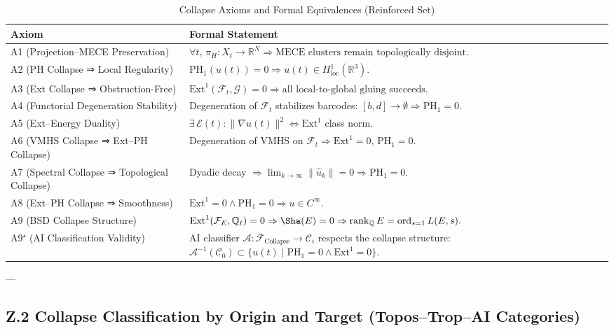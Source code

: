 \documentclass[11pt]{article}
\begin{document}
\begin{axiom}
\begin{axiom}
{{\begin{table}[H]
\centering
\renewcommand{\arraystretch}{1.4}
\begin{tabularx}{\textwidth}{lX}
\toprule
\textbf{Axiom} & \textbf{Formal Statement} \\
\midrule
A1 (Projection–MECE Preservation) & 
\( \forall t,\, \pi_H: X_t \to \mathbb{R}^N \Rightarrow \text{MECE clusters remain topologically disjoint}. \) \\
A2 (PH Collapse ⇒ Local Regularity) & 
\( \mathrm{PH}_1(u(t)) = 0 \Rightarrow u(t) \in H^1_{\text{loc}}(\mathbb{R}^3). \) \\
A3 (Ext Collapse ⇒ Obstruction-Free) & 
\( \mathrm{Ext}^1(\mathcal{F}_t, \mathcal{G}) = 0 \Rightarrow \text{all local-to-global gluing succeeds}. \) \\
A4 (Functorial Degeneration Stability) & 
Degeneration of \( \mathcal{F}_t \) stabilizes barcodes: \( [b,d] \to \emptyset \Rightarrow \mathrm{PH}_1 = 0. \) \\
A5 (Ext–Energy Duality) & 
\( \exists\, \mathcal{E}(t): \|\nabla u(t)\|^2 \Leftrightarrow \mathrm{Ext}^1 \) class norm. \\
A6 (VMHS Collapse ⇒ Ext–PH Collapse) & 
Degeneration of VMHS on \( \mathcal{F}_t \Rightarrow \mathrm{Ext}^1 = 0,\, \mathrm{PH}_1 = 0. \) \\
A7 (Spectral Collapse ⇒ Topological Collapse) & 
Dyadic decay \( \Rightarrow \lim_{k \to \infty} \|\hat{u}_k\| = 0 \Rightarrow \mathrm{PH}_1 = 0. \) \\
A8 (Ext–PH Collapse ⇒ Smoothness) & 
\( \mathrm{Ext}^1 = 0 \land \mathrm{PH}_1 = 0 \Rightarrow u \in C^\infty. \) \\
A9 (BSD Collapse Structure) & 
\( \mathrm{Ext}^1(\mathcal{F}_E, \mathbb{Q}_\ell) = 0 \Rightarrow \Sha(E) = 0 \Rightarrow 
\operatorname{rank}_{\mathbb{Q}} E = \operatorname{ord}_{s=1} L(E, s). \) \\
A9⁺ (AI Classification Validity) & 
AI classifier \( \mathcal{A}: \mathcal{F}_{\text{Collapse}} \to \mathcal{C}_i \) respects the collapse structure:  
\( \mathcal{A}^{-1}(\mathcal{C}_0) \subset \{ u(t) \mid \mathrm{PH}_1 = 0 \land \mathrm{Ext}^1 = 0 \} \). \\
\bottomrule
\end{tabularx}
\caption{Collapse Axioms and Formal Equivalences (Reinforced Set)}
\end{table}

---

\subsection*{Z.2 Collapse Classification by Origin and Target (Topos–Trop–AI Categories)}

}}
\end{axiom}
\end{axiom}
\end{document}
